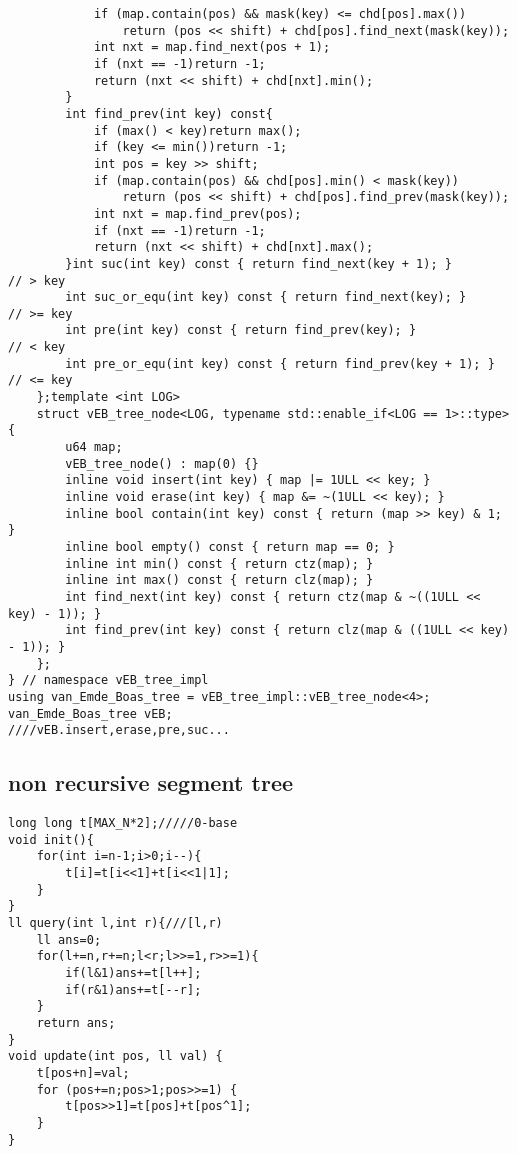 \documentclass[landscape, 8pt, a4paper, oneside, twocolumn]{extarticle}
\begin{document}
\begin{verbatim}
            if (map.contain(pos) && mask(key) <= chd[pos].max())
                return (pos << shift) + chd[pos].find_next(mask(key));
            int nxt = map.find_next(pos + 1);
            if (nxt == -1)return -1;
            return (nxt << shift) + chd[nxt].min();
        }
        int find_prev(int key) const{
            if (max() < key)return max();
            if (key <= min())return -1;
            int pos = key >> shift;
            if (map.contain(pos) && chd[pos].min() < mask(key))
                return (pos << shift) + chd[pos].find_prev(mask(key));
            int nxt = map.find_prev(pos);
            if (nxt == -1)return -1;
            return (nxt << shift) + chd[nxt].max();
        }int suc(int key) const { return find_next(key + 1); }        // > key
        int suc_or_equ(int key) const { return find_next(key); }     // >= key
        int pre(int key) const { return find_prev(key); }            // < key
        int pre_or_equ(int key) const { return find_prev(key + 1); } // <= key
    };template <int LOG>
    struct vEB_tree_node<LOG, typename std::enable_if<LOG == 1>::type>{
        u64 map;
        vEB_tree_node() : map(0) {}
        inline void insert(int key) { map |= 1ULL << key; }
        inline void erase(int key) { map &= ~(1ULL << key); }
        inline bool contain(int key) const { return (map >> key) & 1; }
        inline bool empty() const { return map == 0; }
        inline int min() const { return ctz(map); }
        inline int max() const { return clz(map); }
        int find_next(int key) const { return ctz(map & ~((1ULL << key) - 1)); }
        int find_prev(int key) const { return clz(map & ((1ULL << key) - 1)); }
    };
} // namespace vEB_tree_impl
using van_Emde_Boas_tree = vEB_tree_impl::vEB_tree_node<4>;
van_Emde_Boas_tree vEB;
////vEB.insert,erase,pre,suc...
\end{verbatim}
\subsection{non recursive segment tree}
\begin{verbatim}
long long t[MAX_N*2];/////0-base
void init(){
    for(int i=n-1;i>0;i--){
        t[i]=t[i<<1]+t[i<<1|1];
    }
}
ll query(int l,int r){///[l,r)
    ll ans=0;
    for(l+=n,r+=n;l<r;l>>=1,r>>=1){
        if(l&1)ans+=t[l++];
        if(r&1)ans+=t[--r];
    }
    return ans;
}
void update(int pos, ll val) {
    t[pos+n]=val;
    for (pos+=n;pos>1;pos>>=1) {
        t[pos>>1]=t[pos]+t[pos^1];
    }
}
\end{verbatim}
\end{document}
